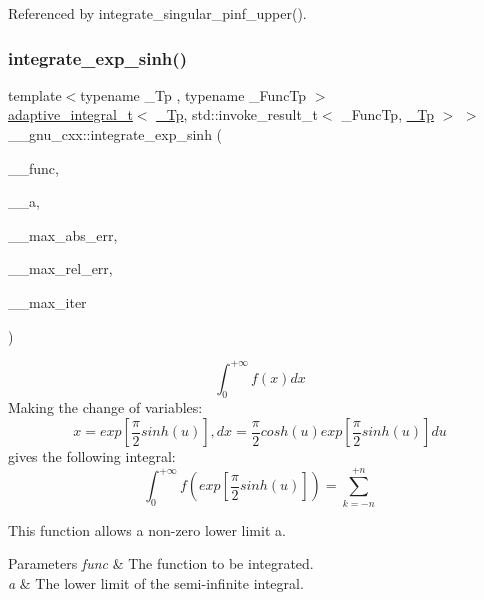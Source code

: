 Referenced by integrate\+\_\+singular\+\_\+pinf\+\_\+upper().

\mbox{\label{namespace____gnu__cxx_a8d2d406894714b19396add57a77260c4}} 
\subsubsection{\texorpdfstring{integrate\+\_\+exp\+\_\+sinh()}{integrate\_exp\_sinh()}}
{\footnotesize\ttfamily template$<$typename \+\_\+\+Tp , typename \+\_\+\+Func\+Tp $>$ \\
\hyperlink{struct____gnu__cxx_1_1adaptive__integral__t}{adaptive\+\_\+integral\+\_\+t}$<$ \hyperlink{namespace____gnu__cxx_a3b19a9c800ca194374ef9172290f7d79}{\+\_\+\+Tp}, std\+::invoke\+\_\+result\+\_\+t$<$ \+\_\+\+Func\+Tp, \hyperlink{namespace____gnu__cxx_a3b19a9c800ca194374ef9172290f7d79}{\+\_\+\+Tp} $>$ $>$ \+\_\+\+\_\+gnu\+\_\+cxx\+::integrate\+\_\+exp\+\_\+sinh (\begin{DoxyParamCaption}\item[{\+\_\+\+Func\+Tp}]{\+\_\+\+\_\+func,  }\item[{\hyperlink{namespace____gnu__cxx_a3b19a9c800ca194374ef9172290f7d79}{\+\_\+\+Tp}}]{\+\_\+\+\_\+a,  }\item[{\hyperlink{namespace____gnu__cxx_a3b19a9c800ca194374ef9172290f7d79}{\+\_\+\+Tp}}]{\+\_\+\+\_\+max\+\_\+abs\+\_\+err,  }\item[{\hyperlink{namespace____gnu__cxx_a3b19a9c800ca194374ef9172290f7d79}{\+\_\+\+Tp}}]{\+\_\+\+\_\+max\+\_\+rel\+\_\+err,  }\item[{int}]{\+\_\+\+\_\+max\+\_\+iter }\end{DoxyParamCaption})}

\[ \int_{0}^{+\infty}f(x)dx \] Making the change of variables\+: \[ x = exp\left[\frac{\pi}{2}sinh(u)\right], dx = \frac{\pi}{2} cosh(u) exp\left[\frac{\pi}{2}sinh(u)\right]du \] gives the following integral\+: \[ \int_{0}^{+\infty}f(exp\left[\frac{\pi}{2}sinh(u)\right]) = \sum_{k=-n}^{+n} \]

This function allows a non-\/zero lower limit {\ttfamily a}.


\begin{DoxyParams}{Parameters}
{\em func} & The function to be integrated. \\
\hline
{\em a} & The lower limit of the semi-\/infinite integral. \\
\hline
\end{DoxyParams}


